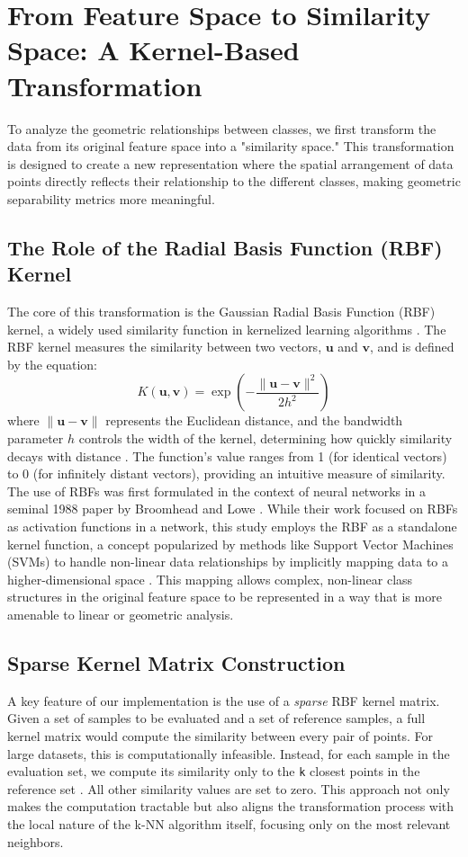 \documentclass[conference]{IEEEtran}
\begin{document}
\section{From Feature Space to Similarity Space: A Kernel-Based Transformation}
To analyze the geometric relationships between classes, we first transform the data from its original feature space into a "similarity space." This transformation is designed to create a new representation where the spatial arrangement of data points directly reflects their relationship to the different classes, making geometric separability metrics more meaningful.

\subsection{The Role of the Radial Basis Function (RBF) Kernel}
The core of this transformation is the Gaussian Radial Basis Function (RBF) kernel, a widely used similarity function in kernelized learning algorithms \cite{b18, b19}. The RBF kernel measures the similarity between two vectors, $\mathbf{u}$ and $\mathbf{v}$, and is defined by the equation:
\begin{equation}
K(\mathbf{u}, \mathbf{v}) = \exp\left(-\frac{\|\mathbf{u} - \mathbf{v}\|^2}{2h^2}\right)
\end{equation}
where $\|\mathbf{u} - \mathbf{v}\|$ represents the Euclidean distance, and the bandwidth parameter $h$ controls the width of the kernel, determining how quickly similarity decays with distance \cite{b18, b20}. The function's value ranges from 1 (for identical vectors) to 0 (for infinitely distant vectors), providing an intuitive measure of similarity. The use of RBFs was first formulated in the context of neural networks in a seminal 1988 paper by Broomhead and Lowe \cite{b21, b22}. While their work focused on RBFs as activation functions in a network, this study employs the RBF as a standalone kernel function, a concept popularized by methods like Support Vector Machines (SVMs) to handle non-linear data relationships by implicitly mapping data to a higher-dimensional space \cite{b18, b19}. This mapping allows complex, non-linear class structures in the original feature space to be represented in a way that is more amenable to linear or geometric analysis.

\subsection{Sparse Kernel Matrix Construction}
A key feature of our implementation is the use of a \textit{sparse} RBF kernel matrix. Given a set of samples to be evaluated and a set of reference samples, a full kernel matrix would compute the similarity between every pair of points. For large datasets, this is computationally infeasible. Instead, for each sample in the evaluation set, we compute its similarity only to the \texttt{k} closest points in the reference set \cite{b20}. All other similarity values are set to zero. This approach not only makes the computation tractable but also aligns the transformation process with the local nature of the k-NN algorithm itself, focusing only on the most relevant neighbors.
\end{document}

